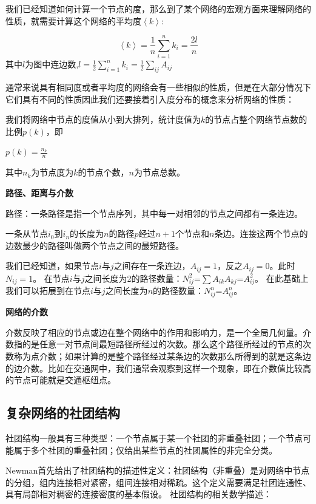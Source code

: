 \documentclass[a4paper,12pt,openany,oneside,utf-8]{ctexbook}
\begin{document}
	我们已经知道如何计算一个节点的度，那么到了某个网络的宏观方面来理解网络的性质，就需要计算这个网络的平均度$\left \langle k\right \rangle$:
	
	\begin{equation}
	\left \langle k\right \rangle=\frac{1}{n}\sum_{i=1}^{n}k_{i}=\frac{2l}{n}
	\end{equation}
	其中$l$为图中连边数,$l=\frac{1}{2}\sum_{i=1}^{n}k_{i}=\frac{1}{2}\sum_{ij}A_{ij}$
	
	通常来说具有相同度或者平均度的网络会有一些相似的性质，但是在大部分情况下它们具有不同的性质因此我们还要接着引入度分布的概念来分析网络的性质：
	
    我们将网络中节点的度值从小到大排列，统计度值为$k$的节点占整个网络节点数的比例$p(k)$，即
    
    \begin{center}
       $p(k)=\frac{n_{k}}{n}$ 
    \end{center}
    其中$n_{k}$为节点度为$k$的节点个数，$n$为节点总数。
    
    \textbf{路径、距离与介数}
    
    路径：一条路径是指一个节点序列，其中每一对相邻的节点之间都有一条连边。
    
    一条从节点$i_{0}$到$i_{n}$的长度为$n$的路径$p$经过$n+1$个节点和$n$条边。连接这两个节点的边数最少的路径叫做两个节点之间的最短路径。
    
    我们已经知道，如果节点$i$与$j$之间存在一条连边，$A_{ij}=1$，反之$A_{ij}=0$。此时$N_{ij}=1$。
    在节点$i$与$j$之间长度为2的路径数量：$N_{ij}^2$=$\sum A_{ik}A_{kj}$=$A^2_{ij}$。
    在此基础上我们可以拓展到在节点$i$与$j$之间长度为$n$的路径数量：$N_{ij}^n$=$A^n_{ij}$。
    
    \textbf{网络的介数}
    
    
    介数反映了相应的节点或边在整个网络中的作用和影响力，是一个全局几何量。介数指的是任意一对节点间最短路径所经过的次数。那么这个路径所经过的节点的次数称为点介数；如果计算的是整个路径经过某条边的次数那么所得到的就是这条边的边介数。比如在交通网中，我们通常会观察到这样一个现象，即在介数值比较高的节点可能就是交通枢纽点。

    \subsection{复杂网络的社团结构}
    社团结构一般具有三种类型：一个节点属于某一个社团的非重叠社团；一个节点可能属于多个社团的重叠社团；仅给出某些节点的社团属性的非完全分类。

    Newman\cite{ref19}首先给出了社团结构的描述性定义：社团结构（非重叠）是对网络中节点的分组，组内连接相对紧密，组间连接相对稀疏。这个定义需要满足社团连通性、具有局部相对稠密的连接密度的基本假设。
    社团结构的相关数学描述：
    
\end{document}
